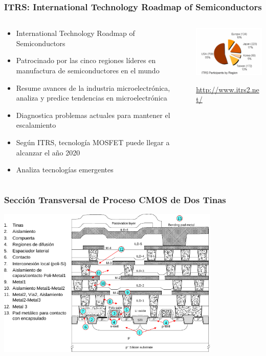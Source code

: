 \documentclass[t,aspectratio=169,10pt]{beamer}
\begin{document}
\begin{frame}
\frametitle{ITRS: International Technology Roadmap of Semiconductors}

\begin{columns}

	\begin{column}{0.6\textwidth}
 
		\begin{itemize}
			\item International Technology Roadmap of Semiconductors
			\item Patrocinado por las cinco regiones líderes en manufactura de semiconductores en el mundo
			\item Resume avances de la industria microelectrónica, analiza y predice tendencias en microelectrónica
			\item Diagnostica problemas actuales para mantener el escalamiento
			\item Según ITRS, tecnología MOSFET puede llegar a alcanzar el año 2020
			\item Analiza tecnologías emergentes
		\end{itemize}
  
	\end{column}
 
	\begin{column}{0.4\textwidth}
 
		\centering \includegraphics[width=6cm]{itrs}
		
		\url{http://www.itrs2.net/}
  
	\end{column}
 
\end{columns}

\end{frame}


\begin{frame}
\frametitle{Sección Transversal de Proceso CMOS de Dos Tinas}
\centering \includegraphics[width=0.8\textwidth]{CMOS-process}
\end{frame}
\end{document}
